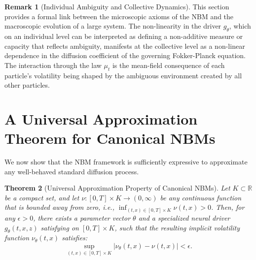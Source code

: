 \documentclass[qian]{imsart}
\newcommand{\R}{\mathbb{R}}
\newcommand{\abs}[1]{\left\lvert#1\right\rvert}
\theoremstyle{plain}
\newtheorem{theorem}{Theorem}[section]
\theoremstyle{definition}
\newtheorem{remark}[theorem]{Remark}
\begin{document}
\begin{remark}[Individual Ambiguity and Collective Dynamics]
This section provides a formal link between the microscopic axioms of the NBM and the macroscopic evolution of a large system. The non-linearity in the driver $g_\theta$, which on an individual level can be interpreted as defining a non-additive measure or capacity that reflects ambiguity, manifests at the collective level as a non-linear dependence in the diffusion coefficient of the governing Fokker-Planck equation. The interaction through the law $\mu_t$ is the mean-field consequence of each particle's volatility being shaped by the ambiguous environment created by all other particles.
\end{remark}

\section{A Universal Approximation Theorem for Canonical NBMs}
\label{sec:uat}

We now show that the NBM framework is sufficiently expressive to approximate any well-behaved standard diffusion process.

\begin{theorem}[Universal Approximation Property of Canonical NBMs]
\label{thm:nbm_uat}
Let $K \subset \R$ be a compact set, and let $\nu: [0,T] \times K \to (0, \infty)$ be any continuous function that is bounded away from zero, i.e., $\inf_{(t,x) \in [0,T] \times K} \nu(t,x) > 0$.
Then, for any $\epsilon > 0$, there exists a parameter vector $\theta$ and a specialized neural driver $g_\theta(t,x,z)$ satisfying  on $[0,T] \times K$, such that the resulting implicit volatility function $\nu_\theta(t,x)$ satisfies:
\[
    \sup_{(t,x) \in [0,T] \times K} \abs{\nu_\theta(t,x) - \nu(t,x)} < \epsilon.
\]
\end{theorem}
\end{document}
